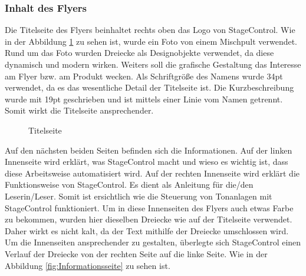 \newpage
\subsubsection{Inhalt des Flyers}
Die Titelseite des Flyers beinhaltet rechts oben das Logo von StageControl. Wie in der Abbildung \ref{fig:Titelseite} zu sehen ist, wurde ein Foto von einem Mischpult verwendet. Rund um das Foto wurden Dreiecke als Designobjekte verwendet, da diese dynamisch und modern wirken. Weiters soll die grafische Gestaltung das Interesse am Flyer bzw. am Produkt wecken. 
Als Schriftgröße des Namens wurde 34pt verwendet, da es das wesentliche Detail der Titelseite ist. Die Kurzbeschreibung wurde mit 19pt geschrieben und ist mittels einer Linie vom Namen getrennt. Somit wirkt die Titelseite ansprechender.

\begin{figure}[H]
	\centering
	\caption[Titelseite]{Titelseite}
	\label{fig:Titelseite}
\end{figure}

\newpage
Auf den nächsten beiden Seiten befinden sich die Informationen. Auf der linken Innenseite wird erklärt, was StageControl macht und wieso es wichtig ist, dass diese Arbeitsweise automatisiert wird. Auf der rechten Innenseite wird erklärt die Funktionsweise von StageControl. Es dient als Anleitung für die/den Leserin/Leser. Somit ist ersichtlich wie die Steuerung von Tonanlagen mit StageControl funktioniert. Um in diese Innenseiten des Flyers auch etwas Farbe zu bekommen, wurden hier dieselben Dreiecke wie auf der Titelseite verwendet. Daher wirkt es nicht kalt, da der Text mithilfe der Dreiecke umschlossen wird. Um die Innenseiten ansprechender zu gestalten, überlegte sich StageControl einen Verlauf der Dreiecke von der rechten Seite auf die linke Seite. Wie in der Abbildung \ref{fig:Informationsseite} zu sehen ist.

